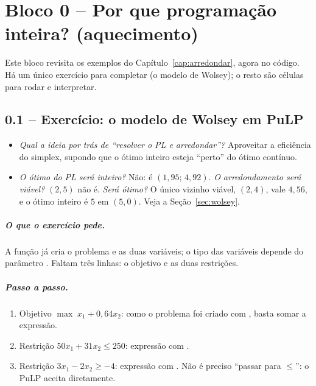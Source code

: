 \chapter{Bloco 0 -- Por que programação inteira? (aquecimento)}
\label{cap:bloco0}

Este bloco revisita os exemplos do Capítulo~\ref{cap:arredondar}, agora no código. Há um único exercício para
completar (o modelo de Wolsey); o resto são células para rodar e interpretar.

\section{0.1 -- Exercício: o modelo de Wolsey em PuLP}

\begin{discussao}
\begin{itemize}
  \item \emph{Qual a ideia por trás de ``resolver o PL e arredondar''?} Aproveitar a eficiência do simplex,
  supondo que o ótimo inteiro esteja ``perto'' do ótimo contínuo.
  \item \emph{O ótimo do PL será inteiro?} Não: é $(1{,}95;\,4{,}92)$. \emph{O arredondamento será viável?}
  $(2,5)$ não é. \emph{Será ótimo?} O único vizinho viável, $(2,4)$, vale $4{,}56$, e o ótimo inteiro é $5$ em
  $(5,0)$. Veja a Seção~\ref{sec:wolsey}.
\end{itemize}
\end{discussao}

\paragraph{O que o exercício pede.} A função já cria o problema e as duas variáveis; o tipo das variáveis depende do
parâmetro . Faltam três linhas: o objetivo e as duas restrições.

\paragraph{Passo a passo.}
\begin{enumerate}
  \item Objetivo $\max\; x_1 + 0{,}64x_2$: como o problema foi criado com , basta somar a expressão.
  \item Restrição $50x_1+31x_2\le250$: expressão com \py{<=}.
  \item Restrição $3x_1-2x_2\ge-4$: expressão com \py{>=}. Não é preciso ``passar para $\le$'': o PuLP aceita
  \py{>=} diretamente.
\end{enumerate}

